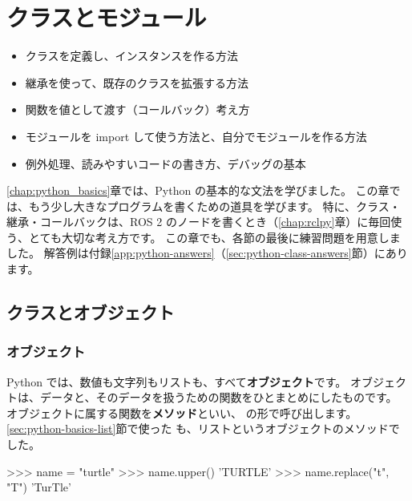 \chapter{クラスとモジュール}
\label{chap:python_class}

\begin{goalbox}
  \begin{itemize}
    \item クラスを定義し、インスタンスを作る方法
    \item 継承を使って、既存のクラスを拡張する方法
    \item 関数を値として渡す（コールバック）考え方
    \item モジュールを import して使う方法と、自分でモジュールを作る方法
    \item 例外処理、読みやすいコードの書き方、デバッグの基本
  \end{itemize}
\end{goalbox}

\ref{chap:python_basics}章では、Python の基本的な文法を学びました。
この章では、もう少し大きなプログラムを書くための道具を学びます。
特に、クラス・継承・コールバックは、ROS 2 のノードを書くとき（\ref{chap:rclpy}章）に毎回使う、とても大切な考え方です。
この章でも、各節の最後に練習問題を用意しました。
解答例は付録\ref{app:python-answers}（\ref{sec:python-class-answers}節）にあります。

\section{クラスとオブジェクト}
\label{sec:python-class-class}

\subsection{オブジェクト}

Python では、数値も文字列もリストも、すべて\textbf{オブジェクト}です。
オブジェクトは、データと、そのデータを扱うための関数をひとまとめにしたものです。
オブジェクトに属する関数を\textbf{メソッド}といい、 の形で呼び出します。
\ref{sec:python-basics-list}節で使った  も、リストというオブジェクトのメソッドでした。

\begin{terminal}[文字列のメソッドを使う]
>>> name = "turtle"
>>> name.upper()
'TURTLE'
>>> name.replace("t", "T")
'TurTle'
\end{terminal}

